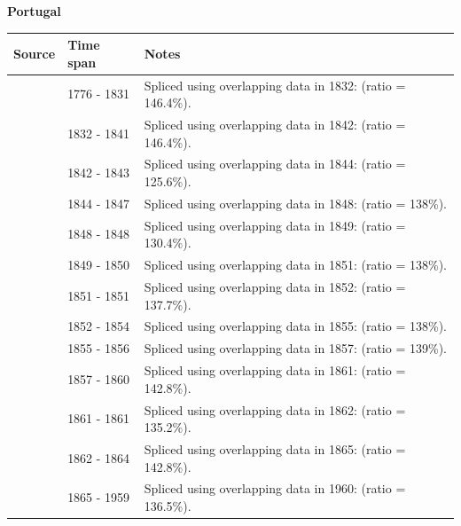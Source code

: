 \documentclass[12pt,a4paper,landscape]{article}
\begin{document}
\begin{adjustbox}{max totalsize={\paperwidth}{\paperheight},center}
\begin{minipage}[t][\textheight][t]{\textwidth}
\vspace*{0.5cm}
{}
\begin{center}
{\Large\bfseries Portugal}
\end{center}
\vspace{0.5cm}
\begin{table}[H]
\centering
\small
\begin{tabular}{|l|l|l|}
\hline
\textbf{Source} & \textbf{Time span} & \textbf{Notes} \\
\hline
\rowcolor{white}\cite{CS1_PRT}& 1776 - 1831 &Spliced using overlapping data in 1832: (ratio = 146.4\%).\\
\rowcolor{lightgray}\cite{Tena}& 1832 - 1841 &Spliced using overlapping data in 1842: (ratio = 146.4\%).\\
\rowcolor{white}\cite{CS1_PRT}& 1842 - 1843 &Spliced using overlapping data in 1844: (ratio = 125.6\%).\\
\rowcolor{lightgray}\cite{Tena}& 1844 - 1847 &Spliced using overlapping data in 1848: (ratio = 138\%).\\
\rowcolor{white}\cite{CS1_PRT}& 1848 - 1848 &Spliced using overlapping data in 1849: (ratio = 130.4\%).\\
\rowcolor{lightgray}\cite{Tena}& 1849 - 1850 &Spliced using overlapping data in 1851: (ratio = 138\%).\\
\rowcolor{white}\cite{CS1_PRT}& 1851 - 1851 &Spliced using overlapping data in 1852: (ratio = 137.7\%).\\
\rowcolor{lightgray}\cite{Tena}& 1852 - 1854 &Spliced using overlapping data in 1855: (ratio = 138\%).\\
\rowcolor{white}\cite{CS1_PRT}& 1855 - 1856 &Spliced using overlapping data in 1857: (ratio = 139\%).\\
\rowcolor{lightgray}\cite{Tena}& 1857 - 1860 &Spliced using overlapping data in 1861: (ratio = 142.8\%).\\
\rowcolor{white}\cite{CS1_PRT}& 1861 - 1861 &Spliced using overlapping data in 1862: (ratio = 135.2\%).\\
\rowcolor{lightgray}\cite{Tena}& 1862 - 1864 &Spliced using overlapping data in 1865: (ratio = 142.8\%).\\
\rowcolor{white}\cite{CS1_PRT}& 1865 - 1959 &Spliced using overlapping data in 1960: (ratio = 136.5\%).\\

\end{tabular}
\end{table}
\end{minipage}
\end{adjustbox}
\end{document}
